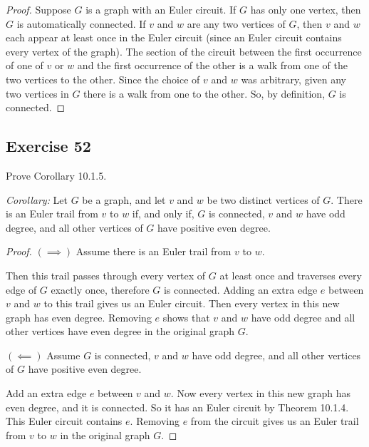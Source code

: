 \documentclass[14pt]{extarticle}
\begin{document}
\begin{proof}
    Suppose \(G\) is a graph with an Euler circuit. If \(G\) has only one vertex, then \(G\) is automatically connected. If
    \(v\) and \(w\) are any two vertices of \(G\), then \(v\) and \(w\) each appear at least once in the Euler circuit (since an
    Euler circuit contains every vertex of the graph). The section of the circuit between the first occurrence of one of \(v\) or
    \(w\) and the first occurrence of the other is a walk from one of the two vertices to the other. Since the choice of \(v\)
    and \(w\) was arbitrary, given any two vertices in \(G\) there is a walk from one to the other. So, by definition,
    \(G\) is connected.
\end{proof}

\subsection{Exercise 52}
Prove Corollary 10.1.5.

    {\it Corollary:} Let \(G\) be a graph, and let \(v\) and \(w\) be two distinct vertices of \(G\). There is an Euler trail
from \(v\) to \(w\) if, and only if, \(G\) is connected, \(v\) and \(w\) have odd degree, and all other vertices of \(G\)
have positive even degree.

\begin{proof}
    \(\bm{(\implies)}\) Assume there is an Euler trail from \(v\) to \(w\).

    Then this trail passes through every vertex of \(G\) at least once and traverses every edge of \(G\) exactly once, therefore
    \(G\) is connected. Adding an extra edge \(e\) between \(v\) and \(w\) to this trail gives us an Euler circuit. Then every
    vertex in this new graph has even degree. Removing \(e\) shows that \(v\) and \(w\) have odd degree and all other vertices
    have even degree in the original graph \(G\).

    \(\bm{(\impliedby)}\) Assume \(G\) is connected, \(v\) and \(w\) have odd degree, and all other vertices of \(G\) have
    positive even degree.

    Add an extra edge \(e\) between \(v\) and \(w\). Now every vertex in this new graph has even degree, and it is connected.
    So it has an Euler circuit by Theorem 10.1.4. This Euler circuit contains \(e\). Removing \(e\) from the circuit gives
    us an Euler trail from \(v\) to \(w\) in the original graph \(G\).
\end{proof}
\end{document}
